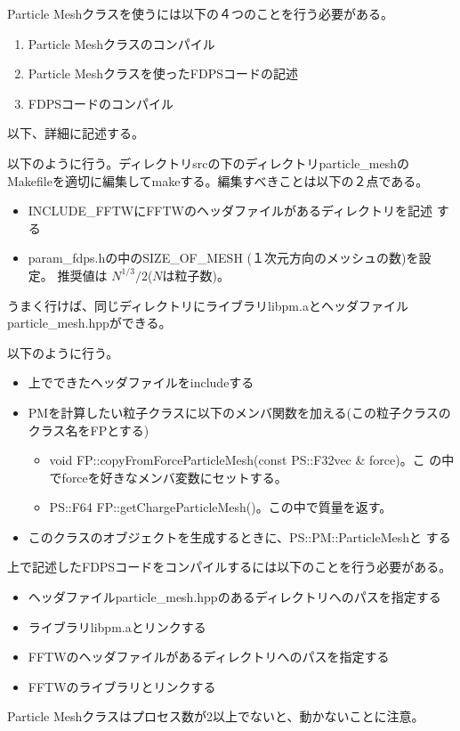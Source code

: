 
Particle Meshクラスを使うには以下の４つのことを行う必要がある。
\begin{enumerate}
\item Particle Meshクラスのコンパイル
\item Particle Meshクラスを使ったFDPSコードの記述
\item FDPSコードのコンパイル
\end{enumerate}
以下、詳細に記述する。


以下のように行う。ディレクトリsrcの下のディレクトリparticle\_meshの
Makefileを適切に編集してmakeする。編集すべきことは以下の２点である。
\begin{itemize}
\item INCLUDE\_FFTWにFFTWのヘッダファイルがあるディレクトリを記述
  する
\item param\_fdps.hの中のSIZE\_OF\_MESH (１次元方向のメッシュの数)を設定。
推奨値は $N^{1/3}/2$($N$は粒子数)。
\end{itemize}
うまく行けば、同じディレクトリにライブラリlibpm.aとヘッダファイル
particle\_mesh.hppができる。


以下のように行う。
\begin{itemize}
\item 上でできたヘッダファイルをincludeする
\item PMを計算したい粒子クラスに以下のメンバ関数を加える(この粒子クラスのクラス名をFPとする)
  \begin{itemize}
  \item void FP::copyFromForceParticleMesh(const PS::F32vec \& force)。こ
     の中でforceを好きなメンバ変数にセットする。
  \item PS::F64 FP::getChargeParticleMesh()。この中で質量を返す。
  \end{itemize}
\item このクラスのオブジェクトを生成するときに、PS::PM::ParticleMeshと
する
\end{itemize}


上で記述したFDPSコードをコンパイルするには以下のことを行う必要がある。
\begin{itemize}
\item ヘッダファイルparticle\_mesh.hppのあるディレクトリへのパスを指定する
\item ライブラリlibpm.aとリンクする
\item FFTWのヘッダファイルがあるディレクトリへのパスを指定する
\item FFTWのライブラリとリンクする
\end{itemize}


Particle Meshクラスはプロセス数が2以上でないと、動かないことに注意。
